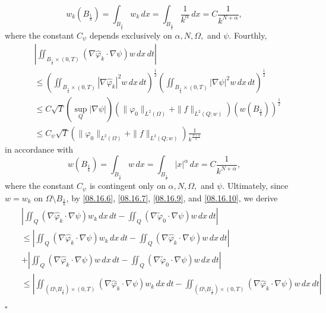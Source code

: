 \documentclass[11pt]{article}
\newenvironment{proof}{{\bf {Proof.}}}{\hfill $\square$}
\numberwithin{equation}{section}
\def\bf{\textbf}
\begin{document}
\begin{proof}
\begin{equation*}
w_k(B_{\frac{1}{k}}) = \int_{B_{\frac{1}{k}}} w_k \, dx = \int_{B_{\frac{1}{k}}} \frac{1}{k^\alpha} \, dx = C \frac{1}{k^{N+\alpha}},
\end{equation*}
where the constant $C_\psi$ depends exclusively on $\alpha, N, \Omega,$ and $\psi$.
Fourthly,
\begin{equation}\label{08.16.10}
\begin{split}
&\left|\iint_{B_{\frac{1}{k}} \times (0,T)} (\nabla\widehat{\varphi}_k \cdot \nabla\psi) w \, dx \, dt\right| \\
&\leq \left(\iint_{B_{\frac{1}{k}} \times (0,T)} |\nabla\widehat{\varphi}_k|^2 w \, dx \, dt\right)^{\frac{1}{2}} \left(\iint_{B_{\frac{1}{k}} \times (0,T)} |\nabla\psi|^2 w \, dx \, dt\right)^{\frac{1}{2}} \\
&\leq C\sqrt{T} \left(\sup_{Q} |\nabla\psi|\right) \left(\|\varphi_0\|_{L^2(\Omega)} + \|f\|_{L^2(Q; w)}\right) \left(w(B_{\frac{1}{k}})\right)^{\frac{1}{2}} \\
&\leq C_\psi \sqrt{T} \left(\|\varphi_0\|_{L^2(\Omega)} + \|f\|_{L^2(Q; w)}\right) \frac{1}{k^{\frac{N+\alpha}{2}}}
\end{split}
\end{equation}
in accordance with
\begin{equation*}
w(B_{\frac{1}{k}}) = \int_{B_{\frac{1}{k}}} w \, dx = \int_{B_{\frac{1}{k}}} |x|^\alpha \, dx = C \frac{1}{k^{N+\alpha}},
\end{equation*}
where the constant $C_\psi$ is contingent only on $\alpha, N, \Omega,$ and $\psi$.
Ultimately, since $w = w_k$ on $\Omega \setminus B_{\frac{1}{k}}$, by \eqref{08.16.6}, \eqref{08.16.7}, \eqref{08.16.9}, and \eqref{08.16.10}, we derive
\begin{eqnarray*}
&&\left|\iint_Q (\nabla\widehat{\varphi}_k \cdot \nabla\psi) w_k \, dx \, dt - \iint_Q (\nabla\widetilde{\varphi}_0 \cdot \nabla\psi) w \, dx \, dt\right| \\
&&\leq \left|\iint_Q (\nabla\widehat{\varphi}_k \cdot \nabla\psi) w_k \, dx \, dt - \iint_Q (\nabla\widehat{\varphi}_k \cdot \nabla\psi) w \, dx \, dt\right| \\
&&  + \left|\iint_Q (\nabla\widehat{\varphi}_k \cdot \nabla\psi) w \, dx \, dt - \iint_Q (\nabla\widetilde{\varphi}_0 \cdot \nabla\psi) w \, dx \, dt\right| \\
&&\leq \left|\iint_{(\Omega \setminus B_{\frac{1}{k}}) \times (0,T)} (\nabla\widehat{\varphi}_k \cdot \nabla\psi) w_k \, dx \, dt - \iint_{(\Omega \setminus B_{\frac{1}{k}}) \times (0,T)} (\nabla\widehat{\varphi}_k \cdot \nabla\psi) w \, dx \, dt\right| \\

\end{eqnarray*}
\end{proof}
\end{document}
